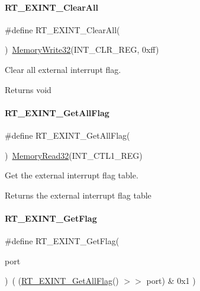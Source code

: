\paragraph{\texorpdfstring{R\+T\+\_\+\+E\+X\+I\+N\+T\+\_\+\+Clear\+All}{RT\_EXINT\_ClearAll}}
{\footnotesize\ttfamily \#define R\+T\+\_\+\+E\+X\+I\+N\+T\+\_\+\+Clear\+All(\begin{DoxyParamCaption}{ }\end{DoxyParamCaption})~\mbox{\hyperlink{a00020_a6b9732365b12e48ddb89fe1028b975b0}{Memory\+Write32}}(I\+N\+T\+\_\+\+C\+L\+R\+\_\+\+R\+EG, 0xff)}



Clear all external interrupt flag. 

\begin{DoxyReturn}{Returns}
void 
\end{DoxyReturn}
\mbox{\label{a00011_ab8287fc872a2d0ae785c8b3b51a37a5e}} 
\paragraph{\texorpdfstring{R\+T\+\_\+\+E\+X\+I\+N\+T\+\_\+\+Get\+All\+Flag}{RT\_EXINT\_GetAllFlag}}
{\footnotesize\ttfamily \#define R\+T\+\_\+\+E\+X\+I\+N\+T\+\_\+\+Get\+All\+Flag(\begin{DoxyParamCaption}{ }\end{DoxyParamCaption})~\mbox{\hyperlink{a00020_a2d484dc15bdf30ee11ab3b05f31f0e16}{Memory\+Read32}}(I\+N\+T\+\_\+\+C\+T\+L1\+\_\+\+R\+EG)}



Get the external interrupt flag table. 

\begin{DoxyReturn}{Returns}
the external interrupt flag table 
\end{DoxyReturn}
\mbox{\label{a00011_ae65409aaf69a9f495207ebbe133f161d}} 
\paragraph{\texorpdfstring{R\+T\+\_\+\+E\+X\+I\+N\+T\+\_\+\+Get\+Flag}{RT\_EXINT\_GetFlag}}
{\footnotesize\ttfamily \#define R\+T\+\_\+\+E\+X\+I\+N\+T\+\_\+\+Get\+Flag(\begin{DoxyParamCaption}\item[{}]{port }\end{DoxyParamCaption})~( (\mbox{\hyperlink{a00011_ab8287fc872a2d0ae785c8b3b51a37a5e}{R\+T\+\_\+\+E\+X\+I\+N\+T\+\_\+\+Get\+All\+Flag}}() $>$$>$ port) \& 0x1 )}



